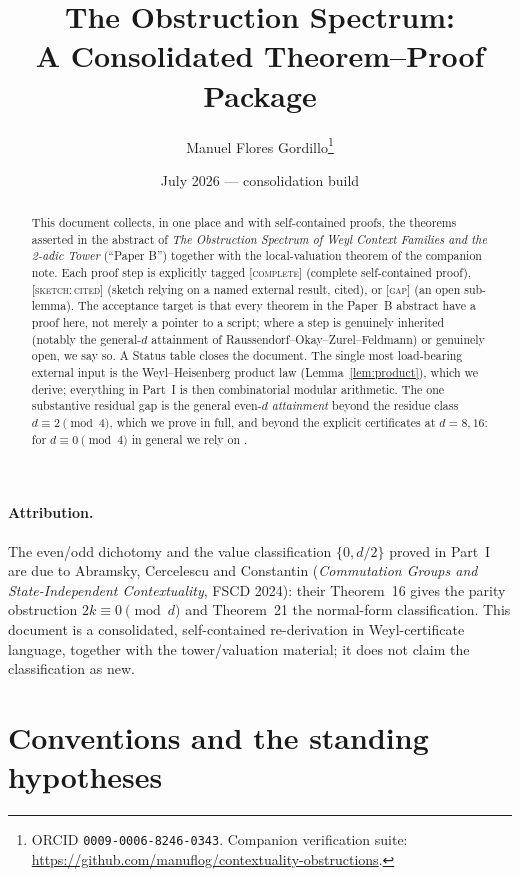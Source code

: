 \documentclass[11pt]{article}
\title{The Obstruction Spectrum:\\ A Consolidated Theorem--Proof Package}
\author{Manuel Flores Gordillo\thanks{ORCID \texttt{0009-0006-8246-0343}. Companion
verification suite: \url{https://github.com/manuflog/contextuality-obstructions}.}}
\date{July 2026 --- consolidation build}
\theoremstyle{definition}
\theoremstyle{remark}
\newcommand{\CO}{\textnormal{\textsc{[complete]}}}
\newcommand{\SK}{\textnormal{\textsc{[sketch:\,cited]}}}
\newcommand{\GAP}{\textnormal{\textsc{[gap]}}}
\begin{document}
\maketitle

\paragraph{Attribution.} The even/odd dichotomy and the value classification $\{0,d/2\}$ proved in Part~I are due to Abramsky, Cercelescu and Constantin (\emph{Commutation Groups and State-Independent Contextuality}, FSCD 2024): their Theorem~16 gives the parity obstruction $2k\equiv0\pmod d$ and Theorem~21 the normal-form classification. This document is a consolidated, self-contained re-derivation in Weyl-certificate language, together with the tower/valuation material; it does not claim the classification as new.



\begin{abstract}
This document collects, in one place and with self-contained proofs, the theorems asserted in
the abstract of \emph{The Obstruction Spectrum of Weyl Context Families and the 2-adic Tower}
(``Paper B'') together with the local-valuation theorem of the companion note. Each proof step is
explicitly tagged \CO{} (complete self-contained proof), \SK{} (sketch relying on a named external
result, cited), or \GAP{} (an open sub-lemma). The acceptance target is that every theorem in the
Paper~B abstract have a proof here, not merely a pointer to a script; where a step is genuinely
inherited (notably the general-$d$ attainment of Raussendorf--Okay--Zurel--Feldmann) or genuinely
open, we say so. A Status table closes the document. The single most load-bearing external input is
the Weyl--Heisenberg product law (Lemma~\ref{lem:product}), which we derive; everything in
Part~I is then combinatorial modular arithmetic. The one substantive residual gap is the general
even-$d$ \emph{attainment} beyond the residue class $d\equiv2\pmod4$, which we prove in full, and
beyond the explicit certificates at $d=8,16$: for $d\equiv0\pmod4$ in general we rely on
\cite{ROZF}.
\end{abstract}

\tableofcontents
\bigskip

\section{Conventions and the standing hypotheses}\label{sec:conv}
\end{document}
